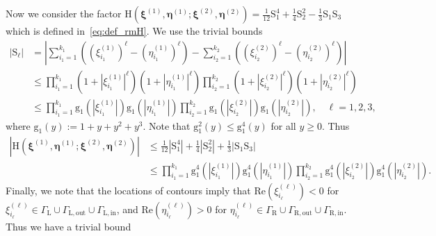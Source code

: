 \documentclass{article}
\numberwithin{equation}{section}
\newcommand{\inn}{\mathrm{in}}
\newcommand{\LL}{\mathrm{L}}
\newcommand{\out}{\mathrm{out}}
\newcommand{\rg}{\mathrm{g}}
\newcommand{\RR}{\mathrm{R}}
\begin{document}
Now we consider the factor $\mathrm{H}(\boldsymbol{\xi}^{(1)},\boldsymbol{\eta}^{(1)};
\boldsymbol{\xi}^{(2)},\boldsymbol{\eta}^{(2)})=\frac{1}{12}\mathrm{S}_1^4+\frac14\mathrm{S}_2^2-\frac13\mathrm{S}_1\mathrm{S}_3$ which is defined in~\eqref{eq:def_rmH}. We use the trivial bounds 
\begin{equation*}
	\begin{split}
		|\mathrm{S}_\ell| &= \left|\sum_{i_1=1}^{k_1}
		\left( \left(\xi_{i_1}^{(1)}\right)^{\ell}
		-\left(\eta_{i_1}^{(1)}\right)^{\ell}
		\right)
		-\sum_{i_2=1}^{k_2}
		\left( \left(\xi_{i_2}^{(2)}\right)^{\ell}
		-\left(\eta_{i_2}^{(2)}\right)^{\ell}
		\right)\right| \\
		&\le \prod_{i_1=1}^{k_1} \left(1+ |\xi_{i_1}^{(1)}|^\ell\right)\left(1+ |\eta_{i_1}^{(1)}|^\ell\right)\prod_{i_2=1}^{k_2} \left(1+ |\xi_{i_2}^{(2)}|^\ell\right)\left(1+ |\eta_{i_2}^{(2)}|^\ell\right)\\
		&\le \prod_{i_1=1}^{k_1}\rg_1\left(|\xi_{i_1}^{(1)}|\right)\rg_1\left(|\eta_{i_1}^{(1)}|\right)\prod_{i_2=1}^{k_2}\rg_1\left(|\xi_{i_2}^{(2)}|\right)\rg_1\left(|\eta_{i_2}^{(2)}|\right),\quad \ell=1,2,3,
	\end{split}
\end{equation*}
where $\rg_1(y):=1+y+y^2+y^3$. Note that $\rg_1^2(y)\le \rg_1^4(y)$ for all $y\ge 0$. Thus
\begin{equation}
	\label{eq:aux_13}
	\begin{split}
		|\mathrm{H}(\boldsymbol{\xi}^{(1)},\boldsymbol{\eta}^{(1)};
		\boldsymbol{\xi}^{(2)},\boldsymbol{\eta}^{(2)})|
		&\le \frac1{12}|\mathrm{S}_1^4|+\frac{1}{4}|\mathrm{S}_2^2|+\frac{1}{3}|\mathrm{S}_1\mathrm{S}_3|\\
		&\le \prod_{i_1=1}^{k_1}\rg_1^4\left(|\xi_{i_1}^{(1)}|\right)\rg_1^4\left(|\eta_{i_1}^{(1)}|\right)\prod_{i_2=1}^{k_2}\rg_1^4\left(|\xi_{i_2}^{(2)}|\right)\rg_1^4\left(|\eta_{i_2}^{(2)}|\right).
	\end{split}
\end{equation}
Finally, we note that the locations of contours imply that $\mathrm{Re}(\xi_{i_\ell}^{(\ell)})<0$ for $\xi_{i_\ell}^{(\ell)}\in\Gamma_\LL\cup\Gamma_{\LL,\out}\cup\Gamma_{\LL,\inn}$, and $\mathrm{Re}(\eta_{i_\ell}^{(\ell)})>0$ for $\eta_{i_\ell}^{(\ell)}\in\Gamma_\RR\cup\Gamma_{\RR,\out}\cup\Gamma_{\RR,\inn}$. Thus we have a trivial bound
\end{document}
